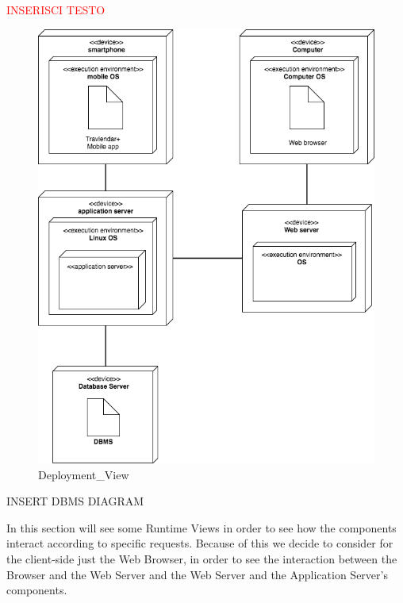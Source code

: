 \textcolor{red}{\Huge INSERISCI TESTO}
\begin{figure}[H]
	\centering
	\includegraphics[scale=0.17]{Images/Architecture/Deployment_View}
	\caption{Deployment\_View}
\end{figure}


INSERT DBMS DIAGRAM

In this section will see some Runtime Views in order to see how the components interact according to specific requests.
Because of this we decide to consider for the client-side just the Web Browser, in order to see the interaction between the Browser and the Web Server and the Web Server and the Application Server's components.


